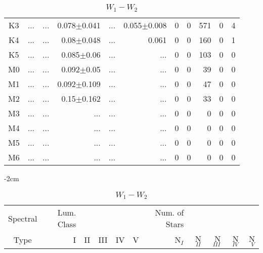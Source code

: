 \begin{table}[t]
\begin{table}[t]
\begin{center}
\begin{tabular}{c|rrrrr|rrrrr}
    K3	&	 ...	&	 ...	&	0.078$\pm$0.041	&	 ...	&	0.055$\pm$0.008	&	0	&	0	&	571	&	0	&	4	\\
    K4	&	 ...	&	 ...	&	0.08$\pm$0.048	&	 ...	&	0.061	&	0	&	0	&	160	&	0	&	1	\\
    K5	&	 ...	&	 ...	&	0.085$\pm$0.06	&	 ...	&	 ...	&	0	&	0	&	103	&	0	&	0	\\
    M0	&	 ...	&	 ...	&	0.092$\pm$0.05	&	 ...	&	 ...	&	0	&	0	&	39	&	0	&	0	\\
    M1	&	 ...	&	 ...	&	0.092$\pm$0.109	&	 ...	&	 ...	&	0	&	0	&	47	&	0	&	0	\\
    M2	&	 ...	&	 ...	&	0.15$\pm$0.162	&	 ...	&	 ...	&	0	&	0	&	33	&	0	&	0	\\
    M3	&	 ...	&	 ...	&	 ...	&	 ...	&	 ...	&	0	&	0	&	0	&	0	&	0	\\
    M4	&	 ...	&	 ...	&	 ...	&	 ...	&	 ...	&	0	&	0	&	0	&	0	&	0	\\
    M5	&	 ...	&	 ...	&	 ...	&	 ...	&	 ...	&	0	&	0	&	0	&	0	&	0	\\
    M6	&	 ...	&	 ...	&	 ...	&	 ...	&	 ...	&	0	&	0	&	0	&	0	&	0	\\
        \bottomrule
        \end{tabular}
    \end{center}
    \end{table}
    
    
    \begin{table}[t]
    \tiny
    \centering
    \caption{$W_{1}-W_{2}$}
    \begin{center}
        \addtolength{\leftskip} {-2cm}
        \addtolength{\rightskip}{-2cm}
        \begin{tabular}{c|rrrrr|rrrrr}
        \toprule
        Spectral & Lum. Class & & & & & Num. of Stars & & & &  \\
        Type & I & II & III &  IV & V & N$_{I}$ & N$_{II}$ & N$_{III}$ & N$_{IV}$ & N$_{V}$ \\ \midrule
      

\end{tabular}
\end{center}
\end{table}
\end{table}
